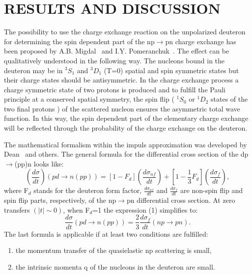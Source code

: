 \documentclass[a4paper,12pt]{article}
\begin{document}
    \section{RESULTS AND DISCUSSION}
    The possibility to use the charge exchange reaction on the unpolarized
    deuteron for determining the spin dependent part of the np$\to$pn charge
    exchange has been proposed by A.B. Migdal~\cite{Mig} and
    I.Y. Pomeranchuk~\cite{Pom}. The effect can be qualitatively understood in
    the following way. The nucleons bound in the deuteron may be in $^{3}S_{1}$
    and $^{3}D_{1}$ (T=0) spatial and spin symmetric states but their charge states
    should be antisymmetric. In the charge exchange process a charge
    symmetric state of two protons is produced and to fulfill the Pauli principle
    at a conserved spatial symmetry, the spin flip ( $^{1}S_{0}$ or $^{1}D_{2}$
    states of the two final protons )
    of the scattered nucleon ensures the asymmetric total wave function. In this
    way, the spin dependent part of the elementary charge exchange will be
    reflected through the probability of the charge exchange on the deuteron.

    The mathematical formalism within the impuls approximation was developed
    by Dean~\cite{Dea} and others. The general formula for the differential
    cross section of the dp$\to$(pp)n looks like:
    \begin{equation}
      \left( \frac{d\sigma }{dt}\right) (pd\rightarrow n(pp))=[1-F_d]\left(
      \frac{d\sigma _{nf}}{dt}\right) +[1-\frac{1}{3}F_d]
      \left(\frac{d\sigma _f}{dt}\right),
    \end{equation}
    where F$_d$ stands for the deuteron form factor, $\frac{d\sigma _{nf}}{dt}$ and
    $\frac{d\sigma _f}{dt}$ are non-spin flip and spin flip parts, respectively,
    of the np$\to$pn differential cross section. At zero transfers
    $(\vert t \vert\sim 0)$, when F$_d$=1 the expression (1) simplifies to:
    \begin{equation}
      \frac{d\sigma }{dt}(pd\rightarrow n(pp))=\frac 23\frac{d\sigma _f}
           {dt}(np\rightarrow pn).
    \end{equation}
    The last formula is applicable if at least two conditions are fulfilled:
    \begin{enumerate}
    \item the momentum transfer of the quasielastic np scattering is small,
    \item the intrinsic momenta q of the nucleons in the deuteron are small.
    \end{enumerate}
\end{document}
